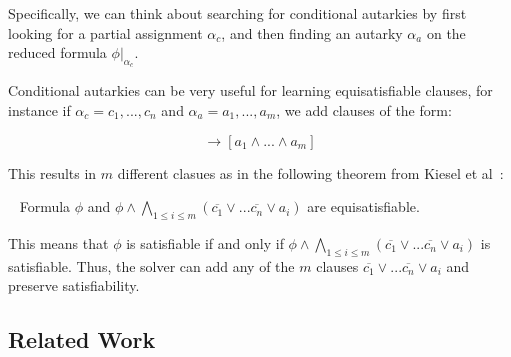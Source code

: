 Specifically, we can think about searching for conditional autarkies by first looking for a partial assignment $\alpha_c$, and then finding an autarky $\alpha_a$ on the reduced formula $\phi|_{\alpha_c}$.

Conditional autarkies can be very useful for learning equisatisfiable clauses, for instance if $\alpha_c = c_1, ..., c_n$ and $\alpha_a = a_1, ..., a_m$, we add clauses of the form:

\begin{equation*}
    [c_1 \land ... \land c_n] \rightarrow [a_1 \land ... \land a_m]
\end{equation*}

This results in $m$ different clasues as in the following theorem from Kiesel et al~\cite{conditionalautarkies}:

\begin{theorem}~\label{thm:gbcequisat}
    Formula $\phi$ and $\phi \land \bigwedge_{1 \leq i \leq m} (\overline{c_1} \lor ... \overline{c_n} \lor a_i)$ are equisatisfiable.
\end{theorem}

This means that $\phi$ is satisfiable if and only if $\phi \land \bigwedge_{1 \leq i \leq m} (\overline{c_1} \lor ... \overline{c_n} \lor a_i)$ is satisfiable. Thus, the solver can add any of the $m$ clauses $\overline{c_1} \lor ... \overline{c_n} \lor a_i$ and preserve satisfiability. 



   




\subsection{Related Work}~\label{subsec:relatedwork}

